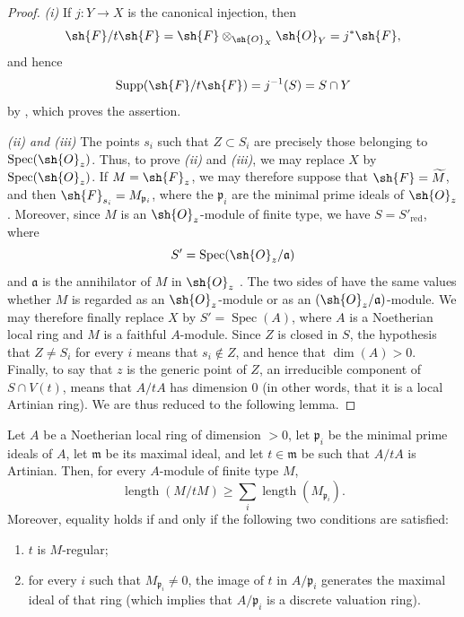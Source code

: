 \begin{proof}
\emph{(i)} If $j:Y\to X$ is the canonical injection, then
\[
\sh{F}/t\sh{F}
  =\sh{F}\otimes_{\sh{O}_X}\sh{O}_Y
  =j^*\sh{F},
\]
and hence
\[
\operatorname{Supp}(\sh{F}/t\sh{F})
  =j^{-1}(S)=S\cap Y
\]
by , which proves the assertion.

\emph{(ii) and (iii)} The points $s_i$ such that $Z\subset S_i$ are precisely those belonging to $\operatorname{Spec}(\sh{O}_z)$.
Thus, to prove \emph{(ii)} and \emph{(iii)}, we may replace $X$ by $\operatorname{Spec}(\sh{O}_z)$.
If $M=\sh{F}_z$, we may therefore suppose that $\sh{F}=\widetilde{M}$, and then $\sh{F}_{s_i}=M_{\mathfrak p_i}$, where the $\mathfrak p_i$ are the minimal prime ideals of $\sh{O}_z$.
Moreover, since $M$ is an $\sh{O}_z$-module of finite type, we have $S=S'_{\mathrm{red}}$, where
\[
S'=\operatorname{Spec}(\sh{O}_z/\mathfrak a)
\]
and $\mathfrak a$ is the annihilator of $M$ in $\sh{O}_z$ .
The two sides of  have the same values whether $M$ is regarded as an $\sh{O}_z$-module or as an $(\sh{O}_z/\mathfrak a)$-module.
We may therefore finally replace $X$ by $S'=\operatorname{Spec}(A)$, where $A$ is a Noetherian local ring and $M$ is a faithful $A$-module.
Since $Z$ is closed in $S$, the hypothesis that $Z\neq S_i$ for every $i$ means that $s_i\notin Z$, and hence that $\dim(A)>0$.
Finally, to say that $z$ is the generic point of $Z$, an irreducible component of $S\cap V(t)$, means that $A/tA$ has dimension $0$ (in other words, that it is a local Artinian ring).
We are thus reduced to the following lemma.
\end{proof}

\begin{lemma}[3.4.1.2]
\label{IV.3.4.1.2}
Let $A$ be a Noetherian local ring of dimension $>0$, let $\mathfrak p_i$ be the minimal prime ideals of $A$, let $\mathfrak m$ be its maximal ideal, and let $t\in\mathfrak m$ be such that $A/tA$ is Artinian.
Then, for every $A$-module of finite type $M$,
\[
\label{IV.3.4.1.3}
\operatorname{length}(M/tM)
  \geqslant
  \sum_i\operatorname{length}(M_{\mathfrak p_i}).
\tag{3.4.1.3}
\]
Moreover, equality holds if and only if the following two conditions are satisfied:
\begin{enumerate}
  \item[\emph{$\alpha$)}] $t$ is $M$-regular;
  \item[\emph{$\beta$)}] for every $i$ such that $M_{\mathfrak p_i}\neq 0$, the image of $t$ in $A/\mathfrak p_i$ generates the maximal ideal of that ring (which implies that $A/\mathfrak p_i$ is a discrete valuation ring).
\end{enumerate}
\end{lemma}


